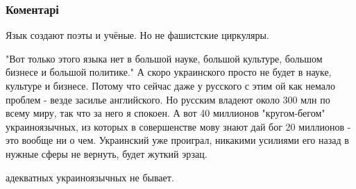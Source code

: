  
 
 
 
 
\subsubsection{Коментарі}
\label{sec:26_07_2021.fb.berdnik_miroslava.1.kultura_unichtozhenie.cmt}

\begin{itemize}
 
Язык создают поэты и учёные. Но не фашистские циркуляры.

 

"Вот только этого языка нет в большой науке, большой культуре, большом бизнесе
и большой политике." А скоро украинского просто не будет в науке, культуре и
бизнесе. Потому что сейчас даже у русского с этим ой как немало проблем - везде
засилье английского. Но русским владеют около 300 млн по всему миру, так что за
него я спокоен. А вот 40 миллионов "кругом-бегом" украиноязычных, из которых в
совершенстве мову знают дай бог 20 миллионов - это вообще ни о чем. Украинский
уже проиграл, никакими усилиями его назад в нужные сферы не вернуть, будет
жуткий эрзац.

 
адекватных украиноязычных не бывает.

\begin{itemize}
 

\end{itemize}
\end{itemize}
